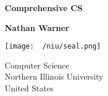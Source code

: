 \documentclass{report}
\title{\Huge{}}
\author{\huge{Nathan Warner}}
\date{\huge{}}
\begin{document}
        \begin{titlepage}
       \begin{center}
           \vspace*{1cm}
    
           \textbf{Comprehensive CS}
    
           \vspace{0.5cm}
            
                
           \vspace{1.5cm}
    
           \textbf{Nathan Warner}
    
           \vfill
                
                
           \vspace{0.8cm}
         
           \texttt{[image: ~/niu/seal.png]}
                
           Computer Science \\
           Northern Illinois University\\
           United States\\
           
                
       \end{center}
    \end{titlepage}
    \tableofcontents
    \pagebreak 
    \bigbreak \noindent 
\end{document}
